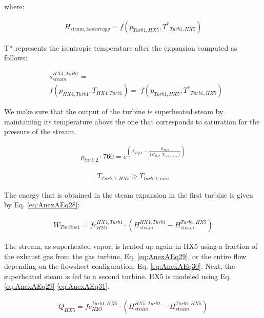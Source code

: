 \begin{refsection}[referencesCh2]
where:

\begin{align}
	{H_{steam , isoentropy}} = {{ f}}\left( {{{{p}}_{{{{Turb1}},{{HX5}}}}},{T^*}_{{{{Turb1,HX5}}}}} \right)  \label{eq:AnexAEq24}
\end{align}

T* represents the isentropic temperature after the expansion computed as follows:

\begin{align}
	& {{{s}}_{{{steam}}}^{{{HX4}},{{Turb1}}}} = \label{eq:AnexAEq25} \\
	& {{f}}\left( {{{{p}}_{{{{HX4}},{{Turb1}}} }},{T_{ {{{HX4,Turb1}}} }}} \right) = \;{{f}}({{{p}}_{ {{{Turb1}},{{HX5}}} }},{T^*}_{ {{{Turb1}},{{HX5}}} })  \nonumber
\end{align}

We make sure that the output of the turbine is superheated steam by maintaining its temperature above the one that corresponds to saturation for the pressure of the stream.

\begin{align}
	{{{p}}_{{{turb,2}}}}\cdot 760 = {e^{\left( {A_{{H_2}O} - \frac{{B_{{H_2}O} }}{{\left( {C_{{H_2}O} \cdot {{{T}}_{{{turb,1, min}}}}} \right)}}} \right)}} \label{eq:AnexAEq26}
\end{align}

\begin{align}
	{{{T}}_{{{{Turb,1}},{{HX5}}} }}{{ > }}{{{T}}_{{{turb,1,min}}}} \label{eq:AnexAEq27}
\end{align}

The energy that is obtained in the steam expansion in the first turbine is given by Eq. \ref{eq:AnexAEq28}:

\begin{align}
	{{W}}_{{{Turbine1}}} = {{ f}}{{{c}}_{ {H2O} }^{{{HX4}},{{Turb1}}}}\cdot\left( {{H_{{{steam}}}^{{{HX4}},{{Turb1}}}} - {{{H}}_{{{steam}}}^{{{Turb1}},{{HX5}}}}} \right)	 \label{eq:AnexAEq28}
\end{align}

The stream, as superheated vapor, is heated up again in HX5 using a fraction of the exhaust gas from the gas turbine, Eq. \ref{eq:AnexAEq29}, or the entire flow depending on the flowsheet configuration, Eq. \ref{eq:AnexAEq30}. Next, the superheated steam is fed to a second turbine. HX5 is modeled using Eq. \ref{eq:AnexAEq29}-\ref{eq:AnexAEq31}.

\begin{align}
	{{{Q}}_{ {{{HX5}}} }} = {{ f}}{{{c}}_{ {H2O} }^{{{Turb1}},{{HX5}}}}\cdot\left( {{H_{steam}^{HX5,Turb2}}{{ - }}{{{H}}_{steam}^{Turb1,HX5}}} \right) \label{eq:AnexAEq29}
\end{align}


\end{refsection}
